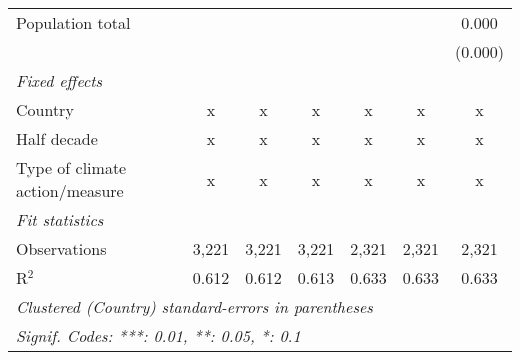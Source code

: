 \begin{tabular}{lcccccc}
   Population total                                                   &         &               &                &                &                & 0.000\\   
                                                                      &         &               &                &                &                & (0.000)\\   
   \emph{Fixed effects}\\
   Country                                                            & x       & x             & x              & x              & x              & x\\  
   Half decade                                                        & x       & x             & x              & x              & x              & x\\  
   Type of climate action/measure                                     & x       & x             & x              & x              & x              & x\\  
   \midrule \emph{Fit statistics}\\
   Observations                                                       & 3,221   & 3,221         & 3,221          & 2,321          & 2,321          & 2,321\\  
   R$^2$                                                              & 0.612   & 0.612         & 0.613          & 0.633          & 0.633          & 0.633\\  
   \midrule
   \multicolumn{7}{l}{\emph{Clustered (Country) standard-errors in parentheses}}\\
   \multicolumn{7}{l}{\emph{Signif. Codes: ***: 0.01, **: 0.05, *: 0.1}}\\
\end{tabular}
\par\endgroup


